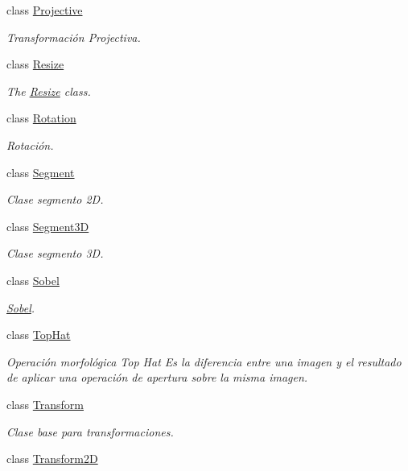 \begin{DoxyCompactItemize}
class \hyperlink{class_i3_d_1_1_projective}{Projective}
\begin{DoxyCompactList}\small\item\em Transformación Projectiva. \end{DoxyCompactList}\item 
class \hyperlink{class_i3_d_1_1_resize}{Resize}
\begin{DoxyCompactList}\small\item\em The \hyperlink{class_i3_d_1_1_resize}{Resize} class. \end{DoxyCompactList}\item 
class \hyperlink{class_i3_d_1_1_rotation}{Rotation}
\begin{DoxyCompactList}\small\item\em Rotación. \end{DoxyCompactList}\item 
class \hyperlink{class_i3_d_1_1_segment}{Segment}
\begin{DoxyCompactList}\small\item\em Clase segmento 2D. \end{DoxyCompactList}\item 
class \hyperlink{class_i3_d_1_1_segment3_d}{Segment3D}
\begin{DoxyCompactList}\small\item\em Clase segmento 3D. \end{DoxyCompactList}\item 
class \hyperlink{class_i3_d_1_1_sobel}{Sobel}
\begin{DoxyCompactList}\small\item\em \hyperlink{class_i3_d_1_1_sobel}{Sobel}. \end{DoxyCompactList}\item 
class \hyperlink{class_i3_d_1_1_top_hat}{Top\+Hat}
\begin{DoxyCompactList}\small\item\em Operación morfológica Top Hat Es la diferencia entre una imagen y el resultado de aplicar una operación de apertura sobre la misma imagen. \end{DoxyCompactList}\item 
class \hyperlink{class_i3_d_1_1_transform}{Transform}
\begin{DoxyCompactList}\small\item\em Clase base para transformaciones. \end{DoxyCompactList}\item 
class \hyperlink{class_i3_d_1_1_transform2_d}{Transform2D}

\end{DoxyCompactItemize}
